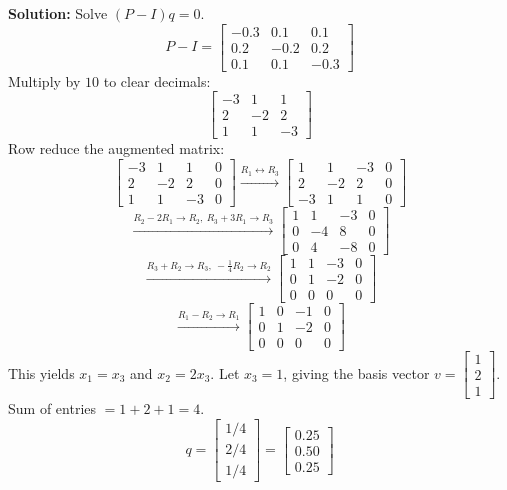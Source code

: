 \documentclass[11pt, letterpaper]{article}
\theoremstyle{definition}
\theoremstyle{remark}
\begin{document}
\textbf{Solution:}
Solve $(P - I)q = 0$.
\[ P - I = \begin{bmatrix} -0.3 & 0.1 & 0.1 \\ 0.2 & -0.2 & 0.2 \\ 0.1 & 0.1 & -0.3 \end{bmatrix} \]
Multiply by $10$ to clear decimals:
\[ \begin{bmatrix} -3 & 1 & 1 \\ 2 & -2 & 2 \\ 1 & 1 & -3 \end{bmatrix} \]
Row reduce the augmented matrix:
\[ \begin{bmatrix} -3 & 1 & 1 & 0 \\ 2 & -2 & 2 & 0 \\ 1 & 1 & -3 & 0 \end{bmatrix} \xrightarrow{R_1 \leftrightarrow R_3} \begin{bmatrix} 1 & 1 & -3 & 0 \\ 2 & -2 & 2 & 0 \\ -3 & 1 & 1 & 0 \end{bmatrix} \]
\[ \xrightarrow{R_2 - 2R_1 \to R_2, \ R_3 + 3R_1 \to R_3} \begin{bmatrix} 1 & 1 & -3 & 0 \\ 0 & -4 & 8 & 0 \\ 0 & 4 & -8 & 0 \end{bmatrix} \]
\[ \xrightarrow{R_3 + R_2 \to R_3, \ -\frac{1}{4}R_2 \to R_2} \begin{bmatrix} 1 & 1 & -3 & 0 \\ 0 & 1 & -2 & 0 \\ 0 & 0 & 0 & 0 \end{bmatrix} \]
\[ \xrightarrow{R_1 - R_2 \to R_1} \begin{bmatrix} 1 & 0 & -1 & 0 \\ 0 & 1 & -2 & 0 \\ 0 & 0 & 0 & 0 \end{bmatrix} \]
This yields $x_1 = x_3$ and $x_2 = 2x_3$. Let $x_3 = 1$, giving the basis vector $v = \begin{bmatrix} 1 \\ 2 \\ 1 \end{bmatrix}$.
Sum of entries $= 1 + 2 + 1 = 4$.
\[ q = \begin{bmatrix} 1/4 \\ 2/4 \\ 1/4 \end{bmatrix} = \begin{bmatrix} 0.25 \\ 0.50 \\ 0.25 \end{bmatrix} \]
\end{document}
